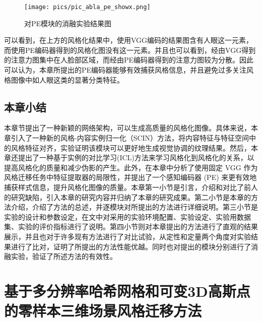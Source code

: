 \begin{figure}[htb]
    \centering
    \texttt{[image: pics/pic\_abla\_pe\_showx.png]}
    \caption{\label{fig:pic_abla_pe}对PE模块的消融实验结果图}
\end{figure}可以看到，在上方的风格化结果中，使用VGG编码的结果图含有人眼这一元素，而使用PE编码器得到的风格化图没有这一元素。并且也可以看到，经由VGG得到的注意力图集中在人脸部区域，而经由PE编码器得到的注意力图较为分散。因此可以认为，本章所提出的PE编码器能够有效捕获风格信息，并且避免过多关注风格图像中如人眼这类的显著分类特征。
\section{本章小结}
本章节提出了一种新颖的网络架构，可以生成高质量的风格化图像。具体来说，本章引入了一种新的风格-内容实例归一化（SCIN）方法，将内容特征与特征空间中的风格特征对齐，实验证明该模块可以更好地生成视觉协调的纹理结果。然后，本章还提出了一种基于实例的对比学习(ICL)方法来学习风格化到风格化的关系，以提高风格化的质量和减少伪影的产生。此外，在本章中分析了使用固定 VGG 作为风格迁移任务中特征提取器的局限性，并提出了一个感知编码器 (PE) 来更有效地捕获样式信息，提升风格化图像的质量。本章第一小节是引言，介绍和对比了前人的研究缺陷，引入本章的研究内容并归纳了本章的研究成果。第二小节是本章的方法介绍，介绍了方法的总述，并逐模块对所提出的方法进行详细说明。第三小节是实验的设计和参数设定，在文中对采用的实验环境配置、实验设定、实验用数据集、实验的评价指标进行了说明。第四小节则对本章提出的方法进行了直观的结果展示，并且也对于许多现有方法进行了对比试验，从定性和定量两个角度对实验结果进行了比对，证明了所提出的方法性能优越。同时也对提出的模块分别进行了消融实验，验证了所述方法的有效性。


\chapter{基于多分辨率哈希网格和可变3D高斯点的零样本三维场景风格迁移方法}
